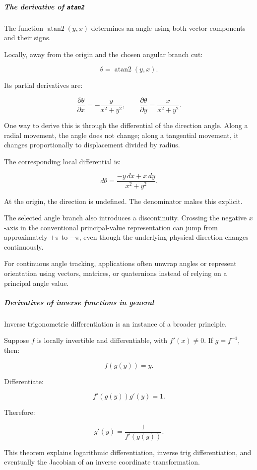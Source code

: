 \subparagraph{\texorpdfstring{The derivative of \texttt{atan2}}{The derivative of atan2}}\label{01-foundations-i-ch020-the-derivative-of-atan2}

The function \(\operatorname{atan2}(y,x)\) determines an angle using both vector components and their signs.

Locally, away from the origin and the chosen angular branch cut:

\[
\theta=\operatorname{atan2}(y,x).
\]

Its partial derivatives are:

\[
\boxed{ \frac{\partial\theta}{\partial x} =-\frac{y}{x^2+y^2}, \qquad \frac{\partial\theta}{\partial y} =\frac{x}{x^2+y^2} }.
\]

One way to derive this is through the differential of the direction angle. Along a radial movement, the angle does not change; along a tangential movement, it changes proportionally to displacement divided by radius.

The corresponding local differential is:

\[
d\theta=\frac{-y\,dx+x\,dy}{x^2+y^2}.
\]

At the origin, the direction is undefined. The denominator makes this explicit.

The selected angle branch also introduces a discontinuity. Crossing the negative \(x\)-axis in the conventional principal-value representation can jump from approximately \(+\pi\) to \(-\pi\), even though the underlying physical direction changes continuously.

For continuous angle tracking, applications often unwrap angles or represent orientation using vectors, matrices, or quaternions instead of relying on a principal angle value.

\subparagraph{Derivatives of inverse functions in general}\label{01-foundations-i-ch020-derivatives-of-inverse-functions-in-general}

Inverse trigonometric differentiation is an instance of a broader principle.

Suppose \(f\) is locally invertible and differentiable, with \(f'(x)\ne0\). If \(g=f^{-1}\), then:

\[
f(g(y))=y.
\]

Differentiate:

\[
f'(g(y))g'(y)=1.
\]

Therefore:

\[
\boxed{g'(y)=\frac1{f'(g(y))}}.
\]

This theorem explains logarithmic differentiation, inverse trig differentiation, and eventually the Jacobian of an inverse coordinate transformation.

